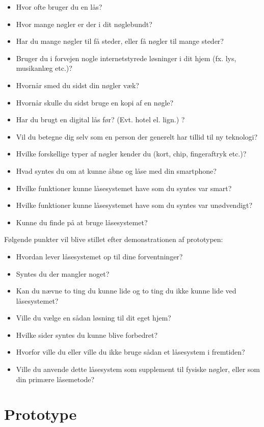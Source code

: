 \documentclass[a4paper,12pt]{article}
\begin{document}
\begin{itemize}
    \item Hvor ofte bruger du en lås?
    \item Hvor mange nøgler er der i dit nøglebundt?
    \item Har du mange nøgler til få steder, eller få nøgler til mange steder?
    \item Bruger du i forvejen nogle internetstyrede løsninger i dit hjem (fx. lys, musikanlæg etc.)?
    \item Hvornår smed du sidst din nøgler væk?
    \item Hvornår skulle du sidst bruge en kopi af en nøgle?
    \item Har du brugt en digital lås før? (Evt. hotel el. lign.) ?
    \item Vil du betegne dig selv som en person der generelt har tillid til ny teknologi?
    \item Hvilke forskellige typer af nøgler kender du (kort, chip, fingeraftryk etc.)?
    \item Hvad syntes du om at kunne åbne og låse med din smartphone?
    \item Hvilke funktioner kunne låsesystemet have som du syntes var smart?
    \item Hvilke funktioner kunne låsesystemet have som du syntes var unødvendigt?
    \item Kunne du finde på at bruge låsesystemet?
\end{itemize}
Følgende punkter vil blive stillet efter demonstrationen af prototypen:

\begin{itemize}
    \item Hvordan lever låsesystemet op til dine forventninger?
    \item Syntes du der mangler noget?
    \item Kan du nævne to ting du kunne lide og to ting du ikke kunne lide ved låsesystemet?
    \item Ville du vælge en sådan løsning til dit eget hjem?
    \item Hvilke sider syntes du kunne blive forbedret?
    \item Hvorfor ville du eller ville du ikke bruge sådan et låsesystem i fremtiden?
    \item Ville du anvende dette låsesystem som supplement til fysiske nøgler, eller som din primære låsemetode?
\end{itemize}

\section{Prototype}
\end{document}
